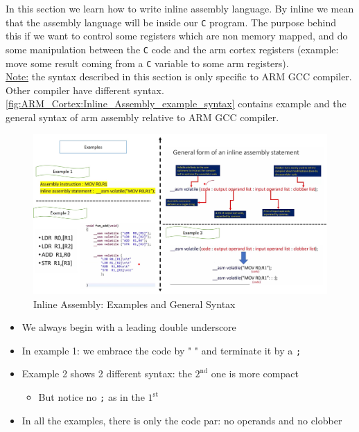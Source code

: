 In this section we learn how to write inline assembly language. By inline we mean that the assembly language will be inside our \verb|C| program. The purpose behind this if we want to control some registers which are non memory mapped, and do some manipulation between the \verb|C| code and the arm cortex registers (example: move some result coming from a \verb|C| variable to some arm registers).\\


\underline{Note:} the syntax described in this section is only specific to ARM GCC compiler. Other compiler have different syntax.\\

\autoref{fig:ARM_Cortex:Inline_Assembly_example_syntax} contains example and the general syntax of arm assembly relative to ARM GCC compiler.

\begin{figure}[h]
\centering
\includegraphics[scale=0.55]{Figures/ARM_Cortex/Inline_Assembly_example_syntax}
\caption{Inline Assembly: Examples and General Syntax}
\label{fig:ARM_Cortex:Inline_Assembly_example_syntax}
\end{figure}


\begin{itemize}
    \item We always begin with a leading double underscore

    \item In example 1: we embrace the code by " " and terminate it by a \verb|;|

    \item Example 2 shows 2 different syntax: the $\mathrm{2}^\mathrm{nd}$ one is more compact

        \begin{itemize}
            \item But notice no \verb|;| as in the $\mathrm{1}^\mathrm{st}$
        \end{itemize}

      \item In all the examples, there is only the code par: no operands and no clobber  
    
\end{itemize}

